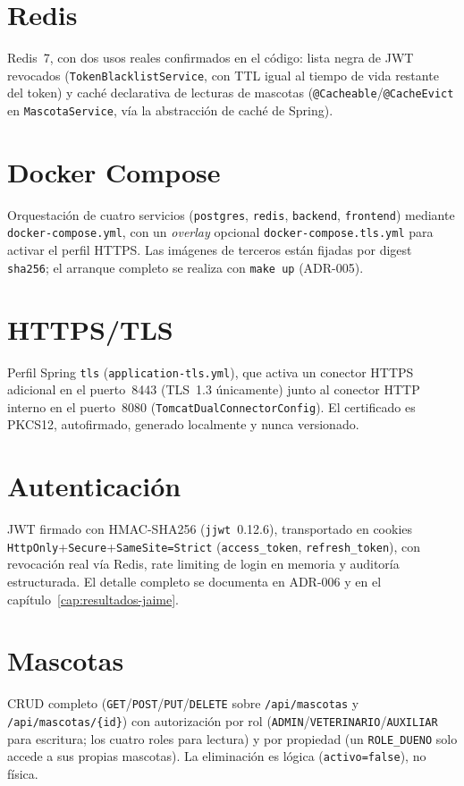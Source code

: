 \section{Redis}
Redis~7, con dos usos reales confirmados en el c\'odigo: lista negra de
JWT revocados (\texttt{TokenBlacklistService}, con TTL igual al tiempo de
vida restante del token) y cach\'e declarativa de lecturas de mascotas
(\texttt{@Cacheable}/\texttt{@CacheEvict} en \texttt{MascotaService}, v\'ia
la abstracci\'on de cach\'e de Spring).

\section{Docker Compose}
Orquestaci\'on de cuatro servicios (\texttt{postgres}, \texttt{redis},
\texttt{backend}, \texttt{frontend}) mediante \texttt{docker-compose.yml},
con un \emph{overlay} opcional \texttt{docker-compose.tls.yml} para activar
el perfil HTTPS. Las im\'agenes de terceros est\'an fijadas por digest
\texttt{sha256}; el arranque completo se realiza con \texttt{make up}
(ADR-005).

\section{HTTPS/TLS}
Perfil Spring \texttt{tls} (\texttt{application-tls.yml}), que activa un
conector HTTPS adicional en el puerto~8443 (TLS~1.3 \'unicamente) junto al
conector HTTP interno en el puerto~8080
(\texttt{TomcatDualConnectorConfig}). El certificado es PKCS12,
autofirmado, generado localmente y nunca versionado.

\section{Autenticaci\'on}
JWT firmado con HMAC-SHA256 (\texttt{jjwt}~0.12.6), transportado en cookies
\texttt{HttpOnly}+\texttt{Secure}+\texttt{SameSite=Strict}
(\texttt{access_token}, \texttt{refresh_token}), con revocaci\'on real v\'ia
Redis, rate limiting de login en memoria y auditor\'ia estructurada. El
detalle completo se documenta en ADR-006 y en el
cap\'itulo~\ref{cap:resultados-jaime}.

\section{Mascotas}
CRUD completo (\texttt{GET}/\texttt{POST}/\texttt{PUT}/\texttt{DELETE}
sobre \texttt{/api/mascotas} y \texttt{/api/mascotas/\{id\}}) con
autorizaci\'on por rol (\texttt{ADMIN}/\texttt{VETERINARIO}/\texttt{AUXILIAR}
para escritura; los cuatro roles para lectura) y por propiedad (un
\texttt{ROLE_DUENO} solo accede a sus propias mascotas). La eliminaci\'on es
l\'ogica (\texttt{activo=false}), no f\'isica.

